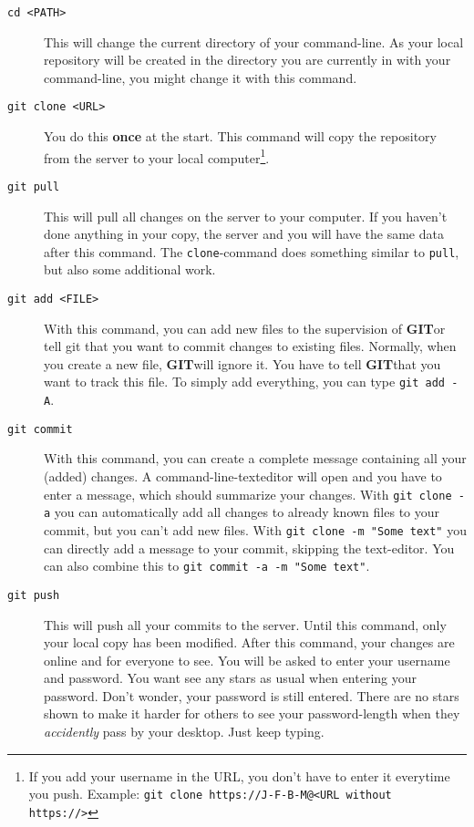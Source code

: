 \documentclass[a4paper]{article}
\newcommand{\git}{\textbf{GIT}}
\begin{document}
\begin{description}
	\item[\texttt{cd <PATH>}] This will change the current directory of your command-line. As your local repository will be created in the directory you are currently in with your command-line, you might change it with this command.
	\item[\texttt{git clone <URL>}] You do this \textbf{once} at the start. This command will copy the repository from the server to your local computer\footnote{If you add your username in the URL, you don't have to enter it everytime you push. Example: \texttt{git clone https://J-F-B-M@<URL without https://>}}. 
	\item[\texttt{git pull}] This will pull all changes on the server to your computer. If you haven't done anything in your copy, the server and you will have the same data after this command. The \texttt{clone}-command does something similar to \texttt{pull}, but also some additional work.
	\item[\texttt{git add <FILE>}] With this command, you can add new files to the supervision of \git or tell git that you want to commit changes to existing files. Normally, when you create a new file, \git will ignore it. You have to tell \git that you want to track this file. To simply add everything, you can type \texttt{git add -A}.
	\item[\texttt{git commit}] With this command, you can create a complete message containing all your (added) changes. A command-line-texteditor will open and you have to enter a message, which should summarize your changes. With \texttt{git clone -a} you can automatically add all changes to already known files to your commit, but you can't add new files. With \texttt{git clone -m "Some text"} you can directly add a message to your commit, skipping the text-editor. You can also combine this to \texttt{git commit -a -m "Some text"}.
	\item[\texttt{git push}] This will push all your commits to the server. Until this command, only your local copy has been modified. After this command, your changes are online and for everyone to see. You will be asked to enter your username and password. You want see any stars as usual when entering your password. Don't wonder, your password is still entered. There are no stars shown to make it harder for others to see your password-length when they \textit{accidently} pass by your desktop. Just keep typing.
\end{description}
\end{document}
